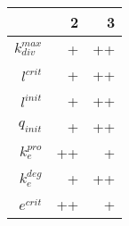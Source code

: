 \begin{tabular}{r| r r }
&2 &3 \\
\hline 
$k_{div}^{max}$&+ &++ \\
$l^{crit}$&+ &++ \\
$l^{init}$&+ &++ \\
$q_{init}$&+ &++ \\
$k_{e}^{pro}$&++ &+ \\
$k_{e}^{deg}$&+ &++ \\
$e^{crit}$&++ &+ \\
\end{tabular}
